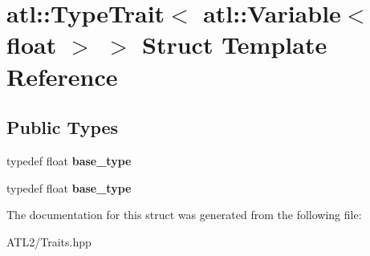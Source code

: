\hypertarget{structatl_1_1_type_trait_3_01atl_1_1_variable_3_01float_01_4_01_4}{\section{atl\+:\+:Type\+Trait$<$ atl\+:\+:Variable$<$ float $>$ $>$ Struct Template Reference}
\label{structatl_1_1_type_trait_3_01atl_1_1_variable_3_01float_01_4_01_4}
}
\subsection*{Public Types}
\begin{DoxyCompactItemize}
\item 
\hypertarget{structatl_1_1_type_trait_3_01atl_1_1_variable_3_01float_01_4_01_4_a2b0d90bee7e7aecd6df320849ab3d589}{typedef float {\bfseries base\+\_\+type}}\label{structatl_1_1_type_trait_3_01atl_1_1_variable_3_01float_01_4_01_4_a2b0d90bee7e7aecd6df320849ab3d589}

\item 
\hypertarget{structatl_1_1_type_trait_3_01atl_1_1_variable_3_01float_01_4_01_4_a2b0d90bee7e7aecd6df320849ab3d589}{typedef float {\bfseries base\+\_\+type}}\label{structatl_1_1_type_trait_3_01atl_1_1_variable_3_01float_01_4_01_4_a2b0d90bee7e7aecd6df320849ab3d589}

\end{DoxyCompactItemize}


The documentation for this struct was generated from the following file\+:\begin{DoxyCompactItemize}
\item 
A\+T\+L2/Traits.\+hpp\end{DoxyCompactItemize}
